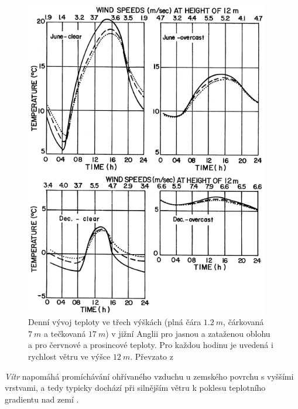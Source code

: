 \begin{figure}
	\centering
	\includegraphics[width=0.95\textwidth]{img/ch1/diurnaltemp.png}
	\caption{Denní vývoj teploty ve třech výškách (plná čára $\SI{1.2}{m}$, čárkovaná $\SI{7}{m}$ a tečkovaná $\SI{17}{m}$) v jižní Anglii pro jasnou a zataženou oblohu a pro červnové a prosincové teploty. Pro každou hodinu je uvedená i rychlost větru ve výšce $\SI{12}{m}$. Převzato z \parencite{arya2001}}
	\label{fig:diurnaltemp}
\end{figure}

\textit{Vítr} napomáhá promíchávání ohřívaného vzduchu u zemského povrchu s vyššími vrstvami, a tedy typicky dochází při silnějším větru k poklesu teplotního gradientu nad zemí \parencite{arya2001}.


